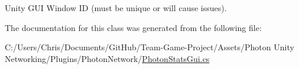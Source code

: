 Unity G\+UI Window ID (must be unique or will cause issues).



The documentation for this class was generated from the following file\+:\begin{DoxyCompactItemize}
\item 
C\+:/\+Users/\+Chris/\+Documents/\+Git\+Hub/\+Team-\/\+Game-\/\+Project/\+Assets/\+Photon Unity Networking/\+Plugins/\+Photon\+Network/\hyperlink{_photon_stats_gui_8cs}{Photon\+Stats\+Gui.\+cs}\end{DoxyCompactItemize}

